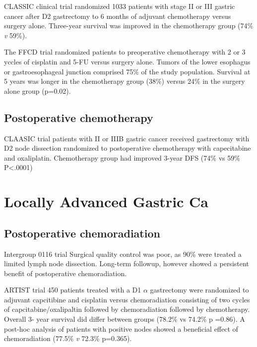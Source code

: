 \documentclass[
]{book}
\begin{document}
CLASSIC clinical trial randomized 1033 patients with stage II or III gastric cancer after D2 gastrectomy to 6 months of adjuvant chemotherapy versus surgery alone. Three-year survival was improved in the chemotherapy group (74\% \emph{v} 59\%).\citep{bang315}

The FFCD trial randomized patients to preoperative chemotherapy with 2 or 3 yccles of cisplatin and 5-FU versus surgery alone. Tumors of the lower esophagus or gastroesophageal junction comprised 75\% of the study population. Survival at 5 years was longer in the chemotherapy group (38\%) versus 24\% in the surgery alone group (p=0.02).\citep{ychou1715}

\hypertarget{postoperative-chemotherapy}{%
\section{Postoperative chemotherapy}\label{postoperative-chemotherapy}}

CLAASIC trial \citep{noh1389} \citep{bang315} patients with II or IIIB gastric cancer received gastrectomy with D2 node dissection randomized to postoperative chemotherapy with capecitabine and oxaliplatin. Chemotherapy group had improved 3-year DFS (74\% vs 59\% P\textless.0001)

\hypertarget{locally-advanced-gastric-ca}{%
\chapter{Locally Advanced Gastric Ca}\label{locally-advanced-gastric-ca}}

\hypertarget{postoperative-chemoradiation-1}{%
\section{Postoperative chemoradiation}\label{postoperative-chemoradiation-1}}

Intergroup 0116 trial \citep{macdonald725}
Surgical quality control was poor, as 90\% were treated a limited lymph node dissection. Long-term followup, however \citep{smalley2327} showed a persistent benefit of postoperative chemoradiation.

ARTIST trial 450 patients treated with a D1 \(\alpha\) gastrectomy were randomized to adjuvant capcitibine and cisplatin versus chemoradiation consisting of two cycles of capcitabine/oxalipaltin followed by chemoradiation followed by chemotherapy. Overall 3- year survival did differ between groups (78.2\% vs 74.2\% p =0.86). A post-hoc analysis of patients with positive nodes showed a beneficial effect of chemoradiation (77.5\% \emph{v} 72.3\% p=0.365).\citep{lee268}
\end{document}
